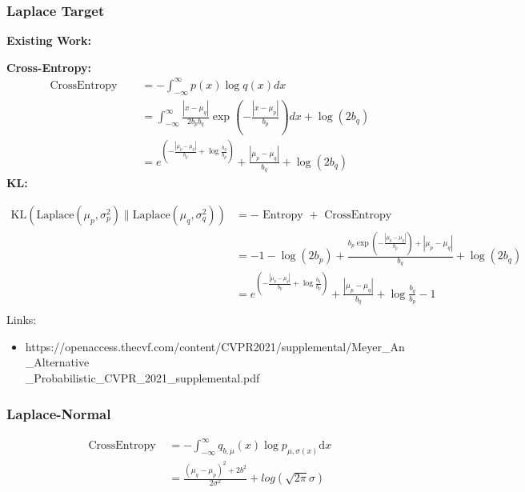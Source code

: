 \documentclass{article}
\begin{document}
\subsubsection{Laplace Target}

\noindent \textbf{Existing Work:}

\noindent \textbf{Cross-Entropy:}
$$ \begin{aligned} \text { CrossEntropy }
\quad &=-\int_{-\infty}^{\infty} p(x) \log q(x) d x \\
\quad &=\int_{-\infty}^{\infty} \frac{\left|x-\mu_{q}\right|}{2 b_{p} b_{q}} \exp \left(-\frac{\left|x-\mu_{p}\right|}{b_{p}}\right) d x+\log \left(2 b_{q}\right)\\&=e^{\left(-\frac{\left|\mu_{p}-\mu_{q}\right|}{b_{p}}+\log{\frac{b_{q}}{b_{p}}}\right)} +\frac{ \left|\mu_{p}-\mu_{q}\right|}{b_{q}}+\log \left(2 b_{q}\right)
\end{aligned}
 $$
\noindent \textbf{KL:}

$$ \begin{aligned}\mathrm{KL}\left(\mathrm{Laplace}\left(\mu_{p}, \sigma_{p}^{2}\right) \| \mathrm{Laplace}\left(\mu_{q}, \sigma_{q}^{2}\right)\right)&=-\text { Entropy }+\text{ CrossEntropy }\\&=-1-\log \left(2 b_{p}\right)+\frac{b_{p} \exp \left(-\frac{\left|\mu_{p}-\mu_{q}\right|}{b_{p}}\right)+\left|\mu_{p}-\mu_{q}\right|}{b_{q}}+\log \left(2 b_{q}\right)\\&=e^{\left(-\frac{\left|\mu_{p}-\mu_{q}\right|}{b_{p}}+\log{\frac{b_{q}}{b_{p}}}\right)} +\frac{ \left|\mu_{p}-\mu_{q}\right|}{b_{q}}+\log \frac{b_{q}}{b_{p}}-1\\
\end{aligned}
$$
Links:
\begin{itemize}
    \item  https://openaccess.thecvf.com/content/CVPR2021/supplemental/Meyer\_An\_Alternative\\\_Probabilistic\_CVPR\_2021\_supplemental.pdf
\end{itemize}


\subsubsection{Laplace-Normal}
$$ \begin{aligned} \text { CrossEntropy }&=
-\int_{-\infty}^{\infty} q_{b,\mu}(x) \log p_{\mu, \sigma(x)} \mathrm{d} x \\
&=\frac{(\mu_{q}-\mu_{p})^{2}+2b^{2}}{2\sigma^{2}}+log(\sqrt{2\pi}\sigma) 
\end{aligned}
 $$
 
\end{document}
